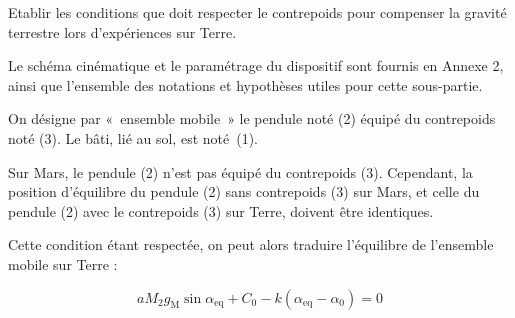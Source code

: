 %
%
%
%
%



\begin{obj}
Etablir les conditions que doit respecter le contrepoids pour compenser la gravité terrestre lors d'expériences sur Terre.
\end{obj}
 

Le schéma cinématique et le paramétrage du dispositif sont fournis en Annexe 2, ainsi que l'ensemble des notations et hypothèses utiles pour cette sous-partie.

On désigne par «~ensemble mobile~» le pendule noté (2) équipé du contrepoids noté (3). Le bâti, lié au sol, est noté~(1).


Sur Mars, le pendule (2) n'est pas équipé du contrepoids (3). Cependant, la position d'équilibre du pendule (2) sans contrepoids (3) sur Mars, et celle du pendule (2) avec le contrepoids (3) sur Terre, doivent être identiques.


Cette condition étant respectée, on peut alors traduire l'équilibre de l'ensemble mobile sur Terre :


$$
a M_{2} g_{\mathrm{M}} \sin \alpha_{\mathrm{eq}}+C_{0}-k\left(\alpha_{\mathrm{eq}}-\alpha_{0}\right)=0 %
$$


